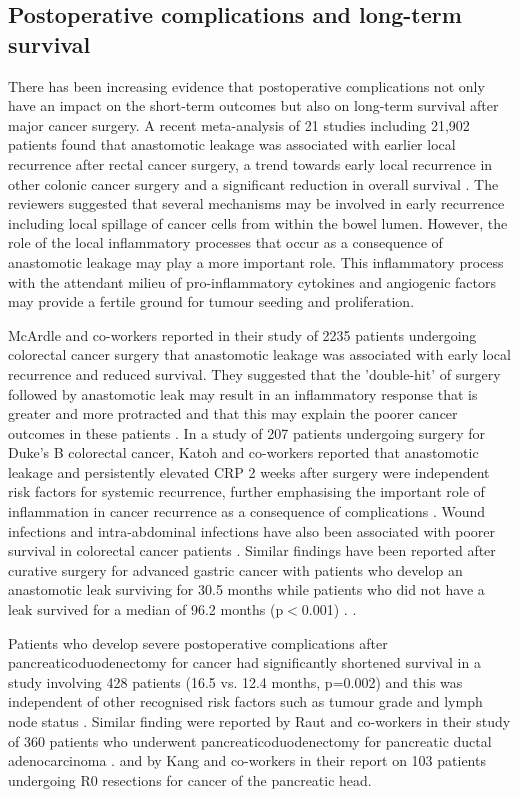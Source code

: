 \subsection{Postoperative complications and long-term survival}
There has been increasing evidence that postoperative complications not only have an impact on the short-term outcomes but also on long-term survival after major cancer surgery. 
A recent meta-analysis of 21 studies including 21,902 patients found that anastomotic leakage was associated with earlier local recurrence after rectal cancer surgery, a trend towards early local recurrence in other colonic cancer surgery and a significant reduction in overall survival \parencite{mirnezami_increased_2011}. 
The reviewers suggested that several mechanisms may be involved in early recurrence including local spillage of cancer cells from within the bowel lumen. 
However, the role of the local inflammatory processes that occur as a consequence of anastomotic leakage may play a more important role. 
This inflammatory process with the attendant milieu of pro-inflammatory cytokines and angiogenic factors may provide a fertile ground for tumour seeding and proliferation.

McArdle and co-workers reported in their study of 2235 patients undergoing colorectal cancer surgery that anastomotic leakage was associated with early local recurrence and reduced survival. 
They suggested that the 'double-hit' of surgery followed by anastomotic leak may result in an inflammatory response that is greater and more protracted and that this may explain the poorer cancer outcomes in these patients \parencite{mcardle_impact_2005}. 
In a study of 207 patients undergoing surgery for Duke's B colorectal cancer, Katoh and co-workers reported that anastomotic leakage and persistently elevated CRP 2 weeks after surgery were independent risk factors for systemic recurrence, further emphasising the important role of inflammation in cancer recurrence as a consequence of complications \parencite{katoh_anastomotic_2011}. 
Wound infections and intra-abdominal infections have also been associated with poorer survival in colorectal cancer patients \parencite{nespoli_impact_2006}. 
Similar findings have been reported after curative surgery for advanced gastric cancer with patients who develop an anastomotic leak surviving for 30.5 months while patients who did not have a leak survived for a median of 96.2 months (p$<$0.001) \parencite{yoo_negative_2011}. . 

Patients who develop severe postoperative complications after pancreaticoduodenectomy for cancer had significantly shortened survival in a study involving 428 patients (16.5 vs. 12.4 months, p=0.002) and this was independent of other recognised risk factors such as tumour grade and lymph node status \parencite{kamphues_postoperative_2012}. 
Similar finding were reported by Raut and co-workers in their study of 360 patients who underwent pancreaticoduodenectomy for pancreatic ductal adenocarcinoma \parencite{raut_impact_2007}. 
and by Kang and co-workers in their report on 103 patients undergoing R0 resections for cancer of the pancreatic head. \parencite{kang_detrimental_2009}

